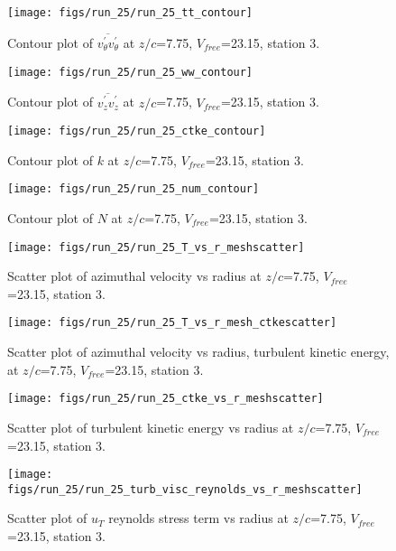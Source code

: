 \begin{figure}[H]
\centering
\texttt{[image: figs/run\_25/run\_25\_tt\_contour]}
\caption{Contour plot of $\overline{v_{\theta}^{\prime} v_{\theta}^{\prime}}$ at $z/c$=7.75, $V_{free}$=23.15, station 3.}
\end{figure}


\begin{figure}[H]
\centering
\texttt{[image: figs/run\_25/run\_25\_ww\_contour]}
\caption{Contour plot of $\overline{v_{z}^{\prime} v_{z}^{\prime}}$ at $z/c$=7.75, $V_{free}$=23.15, station 3.}
\end{figure}


\begin{figure}[H]
\centering
\texttt{[image: figs/run\_25/run\_25\_ctke\_contour]}
\caption{Contour plot of $k$ at $z/c$=7.75, $V_{free}$=23.15, station 3.}
\end{figure}


\begin{figure}[H]
\centering
\texttt{[image: figs/run\_25/run\_25\_num\_contour]}
\caption{Contour plot of $N$ at $z/c$=7.75, $V_{free}$=23.15, station 3.}
\end{figure}


\begin{figure}[H]
\centering
\texttt{[image: figs/run\_25/run\_25\_T\_vs\_r\_meshscatter]}
\caption{Scatter plot of azimuthal velocity vs radius at $z/c$=7.75, $V_{free}$=23.15, station 3.}
\end{figure}


\begin{figure}[H]
\centering
\texttt{[image: figs/run\_25/run\_25\_T\_vs\_r\_mesh\_ctkescatter]}
\caption{Scatter plot of azimuthal velocity vs radius, turbulent kinetic energy, at $z/c$=7.75, $V_{free}$=23.15, station 3.}
\end{figure}


\begin{figure}[H]
\centering
\texttt{[image: figs/run\_25/run\_25\_ctke\_vs\_r\_meshscatter]}
\caption{Scatter plot of turbulent kinetic energy vs radius at $z/c$=7.75, $V_{free}$=23.15, station 3.}
\end{figure}


\begin{figure}[H]
\centering
\texttt{[image: figs/run\_25/run\_25\_turb\_visc\_reynolds\_vs\_r\_meshscatter]}
\caption{Scatter plot of $
u_T$ reynolds stress term vs radius at $z/c$=7.75, $V_{free}$=23.15, station 3.}
\end{figure}


